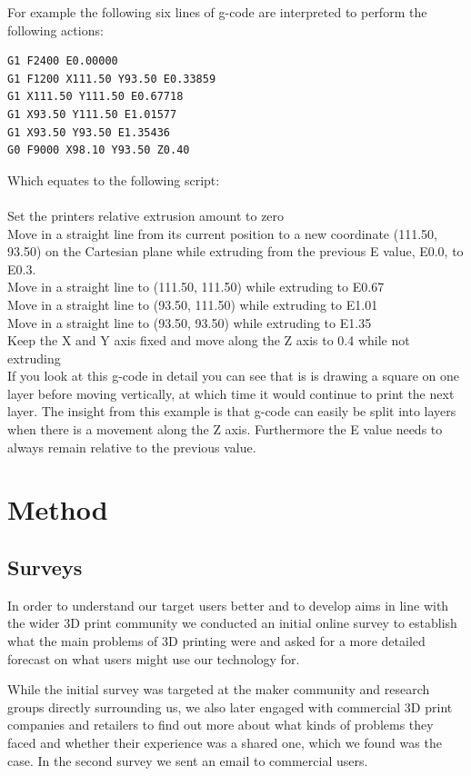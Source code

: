 \documentclass[11pt]{report} %
\begin{document}
For example the following six lines of g-code are interpreted to perform the following actions:
\begin{verbatim}
G1 F2400 E0.00000
G1 F1200 X111.50 Y93.50 E0.33859
G1 X111.50 Y111.50 E0.67718
G1 X93.50 Y111.50 E1.01577
G1 X93.50 Y93.50 E1.35436
G0 F9000 X98.10 Y93.50 Z0.40
\end{verbatim}

Which equates to the following script:\\
\\
Set the printers relative extrusion amount to zero\\
Move in a straight line from its current position to a new coordinate (111.50, 93.50) on the Cartesian plane while extruding from the previous E value, E0.0,  to E0.3.\\
Move in a straight line to (111.50, 111.50) while extruding to E0.67\\
Move in a straight line to (93.50, 111.50) while extruding to E1.01\\
Move in a straight line to (93.50, 93.50) while extruding to E1.35\\
Keep the X and Y axis fixed and move along the Z axis to 0.4 while not extruding\\

If you look at this g-code in detail you can see that is is drawing a square on one layer before moving vertically, at which time it would continue to print the next layer. The insight from this example is that g-code can easily be split into layers when there is a movement along the Z axis. Furthermore the E value needs to always remain relative to the previous value. 




\chapter{Method}
\label{section:Method}
\section{Surveys}
In order to understand our target users better and to develop aims in line with the wider 3D print community we conducted an initial online survey to establish what the main problems of 3D printing were and asked for a more detailed forecast on what users might use our technology for. 

While the initial survey was targeted at the maker community and research groups directly surrounding us, we also later engaged with commercial 3D print companies and retailers to find out more about what kinds of problems they faced and whether their experience was a shared one, which we found was the case. In the second survey we sent an email to commercial users. 
\end{document}
